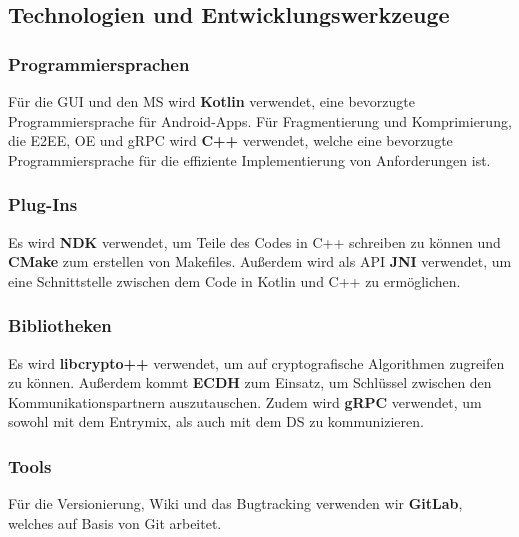 \subsection{Technologien und Entwicklungswerkzeuge}

\subsubsection{Programmiersprachen}
\textnormal{Für die \ac{GUI} und den \ac{MS} wird \textbf{Kotlin} verwendet, eine bevorzugte Programmiersprache für Android-Apps. Für Fragmentierung und Komprimierung, die \ac{E2EE}, \ac{OE} und \ac{gRPC} wird \textbf{C++} verwendet, welche eine bevorzugte Programmiersprache für die effiziente Implementierung von Anforderungen ist.}

\subsubsection{Plug-Ins}
\textnormal{Es wird \textbf{\ac{NDK}} verwendet, um Teile des Codes in C++ schreiben zu können und \textbf{CMake} zum erstellen von Makefiles. Außerdem wird als API \textbf{\ac{JNI}} verwendet, um eine Schnittstelle zwischen dem Code in Kotlin und C++ zu ermöglichen.}

\subsubsection{Bibliotheken}
\textnormal{Es wird \textbf{libcrypto++} verwendet, um auf cryptografische Algorithmen zugreifen zu können. Außerdem kommt \textbf{\ac{ECDH}} zum Einsatz, um Schlüssel zwischen den Kommunikationspartnern auszutauschen. Zudem wird  \textbf{\ac{gRPC}} verwendet, um sowohl mit dem Entrymix, als auch mit dem \ac{DS} zu kommunizieren.}

\subsubsection{Tools}
\textnormal{Für die Versionierung, Wiki und das Bugtracking verwenden wir \textbf{GitLab}, welches auf Basis von Git arbeitet.}
